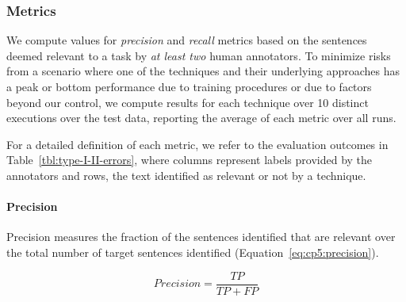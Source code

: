 

\subsubsection{Metrics}



We compute values for \textit{precision} and \textit{recall} metrics based on the sentences 
deemed relevant to a task by \textit{at least two} human annotators.
To minimize risks from a scenario where one of the techniques and their underlying approaches has a peak or
bottom performance due to training procedures or due to factors beyond our control, 
we compute results for each technique over 10 distinct executions over the test data, 
reporting the average of each metric over all runs.





For a detailed definition of each metric, we refer to the evaluation outcomes in Table~\ref{tbl:type-I-II-errors}, where  columns represent  labels provided by the annotators and rows,
the text identified as relevant or not by a technique.

% 

\medskip




\paragraph{\textbf{Precision}}

Precision measures the fraction of the sentences identified that are relevant over the total number of target sentences identified (Equation~\ref{eq:cp5:precision}).



\begin{equation}
\label{eq:cp5:precision}    
    Precision = \frac{TP}{TP + FP}
\end{equation}



